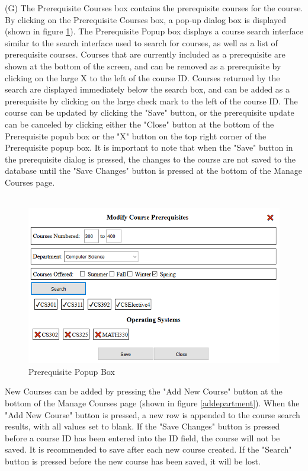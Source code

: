 \documentclass[]{article}
\begin{document}
		(G) The Prerequisite Courses box contains the prerequisite courses for the course. By clicking on the Prerequisite Courses box, a pop-up dialog box is displayed (shown in figure \ref{prereqs}). The Prerequisite Popup box displays a course search interface similar to the search interface used to search for courses, as well as a list of prerequisite courses. Courses that are currently included as a prerequisite are shown at the bottom of the screen, and can be removed as a prerequisite by clicking on the large X to the left of the course ID. Courses returned by the search are displayed immediately below the search box, and can be added as a prerequisite by clicking on the large check mark to the left of the course ID. The course can be updated by clicking the "Save" button, or the prerequisite update can be canceled by clicking either the "Close" button at the bottom of the Prerequisite popub box or the "X" button on the top right corner of the Prerequisite popup box. It is important to note that when the "Save" button in the prerequisite dialog is pressed, the changes to the course are not saved to the database until the "Save Changes" button is pressed at the bottom of the Manage Courses page. \\~\\
		\begin{figure}[H]
			\caption{Prerequisite Popup Box}
			\label{prereqs}
			\includegraphics[width=\textwidth]{prereqs.PNG}
		\end{figure}
	
		New Courses can be added by pressing the "Add New Course" button at the bottom of the Manage Courses page (shown in figure \ref{addepartment}). When the "Add New Course" button is pressed, a new row is appended to the course search results, with all values set to blank. If the "Save Changes" button is pressed before a course ID has been entered into the ID field, the course will not be saved. It is recommended to save after each new course created. If the "Search" button is pressed before the new course has been saved, it will be lost. \\~\\
		
\end{document}
